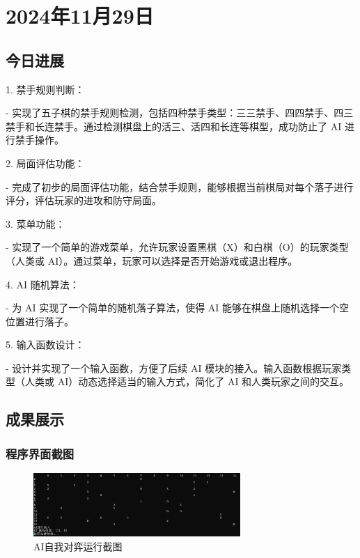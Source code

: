 \section{2024年11月29日} %

\subsection{今日进展} %
1. 禁手规则判断：

   - 实现了五子棋的禁手规则检测，包括四种禁手类型：三三禁手、四四禁手、四三禁手和长连禁手。通过检测棋盘上的活三、活四和长连等棋型，成功防止了 AI 进行禁手操作。

2. 局面评估功能：

   - 完成了初步的局面评估功能，结合禁手规则，能够根据当前棋局对每个落子进行评分，评估玩家的进攻和防守局面。

3. 菜单功能：

   - 实现了一个简单的游戏菜单，允许玩家设置黑棋（X）和白棋（O）的玩家类型（人类或 AI）。通过菜单，玩家可以选择是否开始游戏或退出程序。

4. AI 随机算法：

   - 为 AI 实现了一个简单的随机落子算法，使得 AI 能够在棋盘上随机选择一个空位置进行落子。

5. 输入函数设计：

   - 设计并实现了一个输入函数，方便了后续 AI 模块的接入。输入函数根据玩家类型（人类或 AI）动态选择适当的输入方式，简化了 AI 和人类玩家之间的交互。

\subsection{成果展示} %

\subsubsection{程序界面截图}
\begin{figure}[h]
    \centering
    \includegraphics[width=0.7\textwidth]{logs/image/29日界面.png}
    \caption{AI自我对弈运行截图}
    \label{fig:program_output}
\end{figure}

